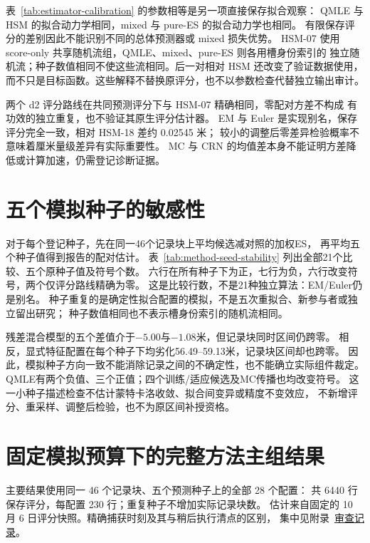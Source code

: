 表~\ref{tab:estimator-calibration} 的参数相等是另一项直接保存拟合观察：
QMLE 与 HSM 的拟合动力学相同，mixed 与 pure-ES 的拟合动力学也相同。
有限保存评分的差别因此不能识别不同的总体预测器或 mixed 损失优势。
HSM-07 使用 score-only 共享随机流组，QMLE、mixed、pure-ES 则各用槽身份索引的
独立随机流；种子数值相同不使这些流相同。后一对相对 HSM 还改变了验证数据使用，
而不只是目标函数。这些解释不替换原评分，也不以参数检查代替独立输出审计。

两个 d2 评分路线在共同预测评分下与 HSM-07 精确相同，零配对方差不构成
有功效的独立重复，也不验证其原生评分估计器。
EM 与 Euler 是实现别名，保存评分完全一致，相对 HSM-18 差约 0.02545 米；
较小的调整后零差异检验概率不意味着厘米量级差异有实际重要性。
MC 与 CRN 的均值差本身不能证明方差降低或计算加速，仍需登记诊断证据。


\section{五个模拟种子的敏感性}
\label{sec:method-seed-stability}\hypertarget{sec:method-seed-stability}{}
对于每个登记种子，先在同一46个记录块上平均候选减对照的加权ES，
再平均五个种子值得到报告的配对估计。
表~\ref{tab:method-seed-stability} 列出全部21个比较、五个原种子值及符号个数。
六行在所有种子下为正，七行为负，六行改变符号，两个仅评分路线精确为零。
这是比较行数，不是21种独立算法：EM/Euler仍是别名。
种子重复的是确定性拟合配置的模拟，不是五次重拟合、新参与者或独立留出研究；
种子数值相同也不表示槽身份索引的随机流相同。

残差混合模型的五个差值介于$-5.00$与$-1.08$米，但记录块同时区间仍跨零。
相反，显式特征配置在每个种子下均劣化56.49--59.13米，记录块区间却也跨零。
因此，模拟种子方向一致不能消除记录之间的不确定性，也不能确立实际组件裁定。
QMLE有两个负值、三个正值；四个训练/适应候选及MC传播也均改变符号。
这一小种子描述检查不估计蒙特卡洛收敛、拟合间变异或精度不变效应，
不新增评分、重采样、调整后检验，也不为原区间补授资格。


\section{固定模拟预算下的完整方法主组结果}
\label{sec:preliminary-methods}\hypertarget{sec:preliminary-methods}{}
主要结果使用同一 46 个记录块、五个预测种子上的全部 28 个配置：
共 6440 行保存评分，每配置 230 行；重复种子不增加实际记录块数。
估计来自固定的 10 月 6 日评分快照。精确捕获时刻及其与稍后执行清点的区别，
集中见附录~\href{audit-notes.pdf\#sec:score-execution-snapshots}{审查记录}。

